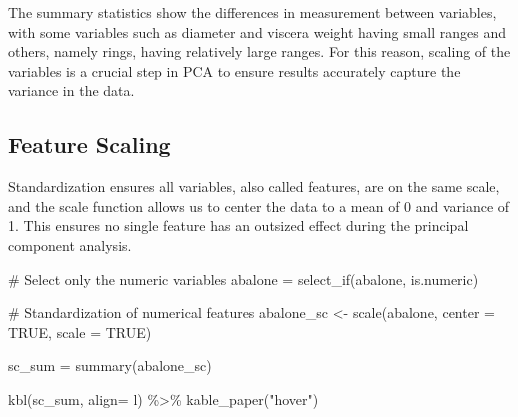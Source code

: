 \documentclass[
  letterpaper,
  DIV=11,
  numbers=noendperiod]{scrreprt}
\newenvironment{Shaded}{\begin{snugshade}}{\end{snugshade}}
\newcommand{\AttributeTok}[1]{\textcolor[rgb]{0.40,0.45,0.13}{#1}}
\newcommand{\CommentTok}[1]{\textcolor[rgb]{0.37,0.37,0.37}{#1}}
\newcommand{\ConstantTok}[1]{\textcolor[rgb]{0.56,0.35,0.01}{#1}}
\newcommand{\FunctionTok}[1]{\textcolor[rgb]{0.28,0.35,0.67}{#1}}
\newcommand{\NormalTok}[1]{\textcolor[rgb]{0.00,0.23,0.31}{#1}}
\newcommand{\OtherTok}[1]{\textcolor[rgb]{0.00,0.23,0.31}{#1}}
\newcommand{\SpecialCharTok}[1]{\textcolor[rgb]{0.37,0.37,0.37}{#1}}
\newcommand{\StringTok}[1]{\textcolor[rgb]{0.13,0.47,0.30}{#1}}
\begin{document}
The summary statistics show the differences in measurement between
variables, with some variables such as diameter and viscera weight
having small ranges and others, namely rings, having relatively large
ranges. For this reason, scaling of the variables is a crucial step in
PCA to ensure results accurately capture the variance in the data.

\hypertarget{feature-scaling}{%
\subsection{Feature Scaling}\label{feature-scaling}}

Standardization ensures all variables, also called features, are on the
same scale, and the scale function allows us to center the data to a
mean of 0 and variance of 1. This ensures no single feature has an
outsized effect during the principal component analysis.

\begin{Shaded}
\begin{Highlighting}[]
\CommentTok{\# Select only the numeric variables }
\NormalTok{abalone }\OtherTok{=} \FunctionTok{select\_if}\NormalTok{(abalone, is.numeric)}

\CommentTok{\# Standardization of numerical features}
\NormalTok{abalone\_sc }\OtherTok{\textless{}{-}} \FunctionTok{scale}\NormalTok{(abalone, }\AttributeTok{center =} \ConstantTok{TRUE}\NormalTok{, }\AttributeTok{scale =} \ConstantTok{TRUE}\NormalTok{)}

\NormalTok{sc\_sum }\OtherTok{=} \FunctionTok{summary}\NormalTok{(abalone\_sc)}

\FunctionTok{kbl}\NormalTok{(sc\_sum, }\AttributeTok{align=} \StringTok{\textquotesingle{}l\textquotesingle{}}\NormalTok{) }\SpecialCharTok{\%\textgreater{}\%}
  \FunctionTok{kable\_paper}\NormalTok{(}\StringTok{"hover"}\NormalTok{)}
\end{Highlighting}
\end{Shaded}
\end{document}
